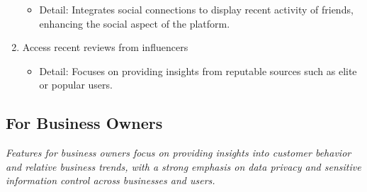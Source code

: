 \documentclass[runningheads]{llncs}
\begin{document}
\begin{enumerate}
    \begin{itemize}
        \item[\textbullet] Detail: Integrates social connections to display recent activity of friends, enhancing the social aspect of the platform.
    \end{itemize}

    \item Access recent reviews from influencers
    
    \begin{itemize}
        \item[\textbullet] Detail: Focuses on providing insights from reputable sources such as elite or popular users.
    \end{itemize}

\end{enumerate}




\subsection{For Business Owners}

\textit{Features for business owners focus on providing insights into customer behavior and relative business trends, with a strong emphasis on data privacy and sensitive information control across businesses and users.}
\end{document}
